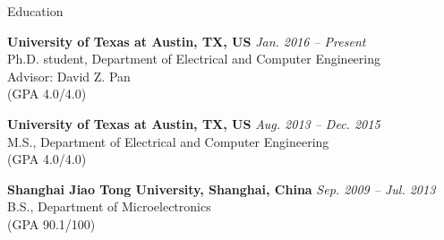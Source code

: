 

\begin{rSection}{Education}


{\bf University of Texas at Austin, TX, US} \hfill {\em Jan. 2016 -- Present} \\ 
Ph.D. student, Department of Electrical and Computer Engineering \\
Advisor: David Z. Pan \\
(GPA 4.0/4.0) 

{\bf University of Texas at Austin, TX, US} \hfill {\em Aug. 2013 -- Dec. 2015} \\ 
M.S., Department of Electrical and Computer Engineering \\
(GPA 4.0/4.0) 

{\bf Shanghai Jiao Tong University, Shanghai, China} \hfill {\em Sep. 2009 -- Jul. 2013} \\ 
B.S., Department of Microelectronics \\
(GPA 90.1/100)

\end{rSection}

